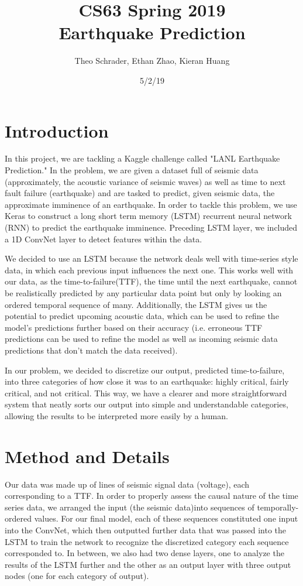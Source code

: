 \documentclass[11pt]{article}
\title{CS63 Spring 2019\\Earthquake Prediction}
\author{Theo Schrader, Ethan Zhao, Kieran Huang}
\date{5/2/19}
\begin{document}
\maketitle

\section{Introduction}

In this project, we are tackling a Kaggle challenge called "LANL Earthquake Prediction." In the problem,
we are given a dataset full of seismic data (approximately, the acoustic variance of seismic waves) as well as time to next fault failure (earthquake) and are tasked to predict,
given seismic data, the approximate imminence of an earthquake. In order to tackle this problem,
we use Keras to construct a long short term memory (LSTM) recurrent neural network (RNN) to
predict the earthquake imminence. Preceding LSTM layer, we included a 1D ConvNet layer to detect features
within the data.

We decided to use an LSTM because the network deals well with time-series style data, in which
each previous input influences the next one. This works well with our data, as the time-to-failure(TTF), the time until the next earthquake, cannot be realistically predicted by any particular data point but only by looking an ordered temporal sequence of many. Additionally,
the LSTM gives us the potential to predict upcoming acoustic data, which can be used to refine the model's predictions further based
on their accuracy (i.e. erroneous TTF predictions can be used to refine the model as well as incoming seismic data predictions that 
don't match the data received).

In our problem, we decided to discretize our output, predicted time-to-failure, into three categories of how close
it was to an earthquake: highly critical, fairly critical, and not critical. This way, we have a clearer and more straightforward
system that neatly sorts our output into simple and understandable categories, allowing the results to be interpreted more easily
by a human. 

\section{Method and Details}


Our data was made up of lines of seismic signal data (voltage), each corresponding to a TTF. In order to properly assess the causal nature of the time series data, we arranged the input (the seismic data)into sequences of temporally-ordered
values. For our final model, each of these sequences constituted one input into the ConvNet, which then outputted further data that was passed into the LSTM to train the network to recognize the
discretized category each sequence corresponded to. In between, we also had two dense layers, one to analyze the results of the LSTM further and the other
as an output layer with three output nodes (one for each category of output).
\end{document}
